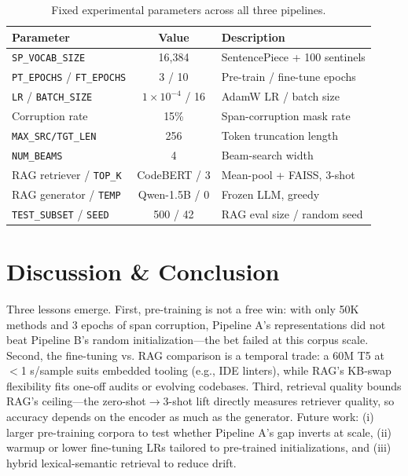 \documentclass[letterpaper,12pt]{article}
\begin{document}
\vspace{-0.2cm}
\begin{table}[h!]
\centering
{
\begin{tabular}{|l|c|l|}
\hline
\textbf{Parameter} & \textbf{Value} & \textbf{Description} \\ \hline
\texttt{SP\_VOCAB\_SIZE}                  & 16{,}384       & SentencePiece + 100 sentinels \\
\texttt{PT\_EPOCHS} / \texttt{FT\_EPOCHS} & 3 / 10         & Pre-train / fine-tune epochs \\
\texttt{LR} / \texttt{BATCH\_SIZE}        & $1\!\times\!10^{-4}$ / 16 & AdamW LR / batch size \\
Corruption rate                           & 15\%           & Span-corruption mask rate \\
\texttt{MAX\_SRC/TGT\_LEN}                & 256            & Token truncation length \\
\texttt{NUM\_BEAMS}                       & 4              & Beam-search width \\
RAG retriever / \texttt{TOP\_K}           & CodeBERT / 3   & Mean-pool + FAISS, 3-shot \\
RAG generator / \texttt{TEMP}             & Qwen-1.5B / 0  & Frozen LLM, greedy \\
\texttt{TEST\_SUBSET} / \texttt{SEED}     & 500 / 42       & RAG eval size / random seed \\ \hline
\end{tabular}}
\caption{Fixed experimental parameters across all three pipelines.}
\label{tab:params}
\end{table}


\vspace{-0.4cm}
\section{Discussion \& Conclusion}

Three lessons emerge. First, pre-training is not a free win: with only 50K methods and 3 epochs of span corruption, Pipeline A's representations did not beat Pipeline B's random initialization---the bet failed at this corpus scale. Second, the fine-tuning vs. RAG comparison is a temporal trade: a 60M T5 at $<$1 s/sample suits embedded tooling (e.g., IDE linters), while RAG's KB-swap flexibility fits one-off audits or evolving codebases. Third, retrieval quality bounds RAG's ceiling---the zero-shot$\rightarrow$3-shot lift directly measures retriever quality, so accuracy depends on the encoder as much as the generator. Future work: (i) larger pre-training corpora to test whether Pipeline A's gap inverts at scale, (ii) warmup or lower fine-tuning LRs tailored to pre-trained initializations, and (iii) hybrid lexical-semantic retrieval to reduce drift.
\end{document}
